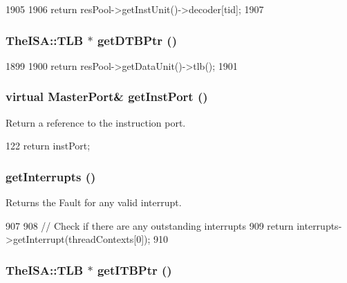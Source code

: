\begin{DoxyCode}
1905 {
1906     return resPool->getInstUnit()->decoder[tid];
1907 }
\end{DoxyCode}
\hypertarget{classInOrderCPU_a295c8ef68d34e6e430da35d8b4b5bd81}{
\subsubsection[{getDTBPtr}]{\setlength{\rightskip}{0pt plus 5cm}TheISA::TLB $\ast$ getDTBPtr ()}}
\label{classInOrderCPU_a295c8ef68d34e6e430da35d8b4b5bd81}



\begin{DoxyCode}
1899 {
1900     return resPool->getDataUnit()->tlb();
1901 }
\end{DoxyCode}
\hypertarget{classInOrderCPU_a40da530cb5dd380fd7fc0d786e94d5eb}{
\subsubsection[{getInstPort}]{\setlength{\rightskip}{0pt plus 5cm}virtual {\bf MasterPort}\& getInstPort ()}}
\label{classInOrderCPU_a40da530cb5dd380fd7fc0d786e94d5eb}
Return a reference to the instruction port. 


\begin{DoxyCode}
122 { return instPort; }
\end{DoxyCode}
\hypertarget{classInOrderCPU_aa2bbcc75bdfc0f2355cd06731e6f5d69}{
\subsubsection[{getInterrupts}]{ getInterrupts ()}}
\label{classInOrderCPU_aa2bbcc75bdfc0f2355cd06731e6f5d69}
Returns the Fault for any valid interrupt. 


\begin{DoxyCode}
907 {
908     // Check if there are any outstanding interrupts
909     return interrupts->getInterrupt(threadContexts[0]);
910 }
\end{DoxyCode}
\hypertarget{classInOrderCPU_aec8d740c4f6e13264bb6bcb0a2f95a5a}{
\subsubsection[{getITBPtr}]{\setlength{\rightskip}{0pt plus 5cm}TheISA::TLB $\ast$ getITBPtr ()}}
\label{classInOrderCPU_aec8d740c4f6e13264bb6bcb0a2f95a5a}



